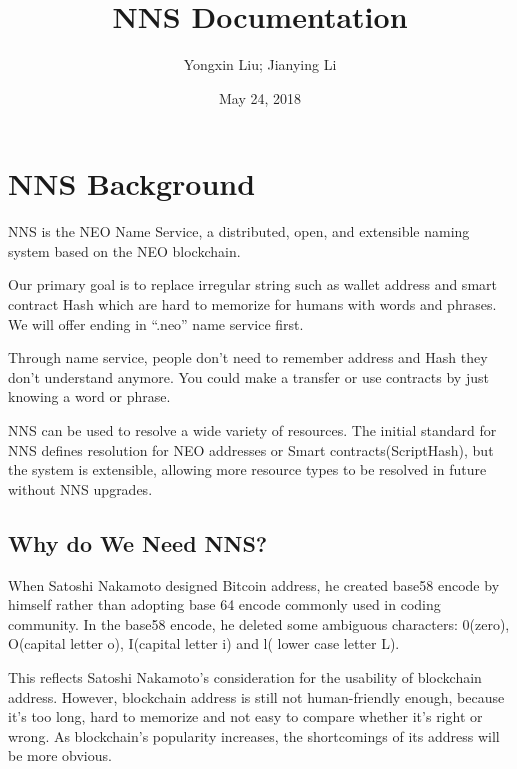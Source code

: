 \documentclass[letterpaper,10pt,english]{sphinxmanual}
\title{NNS Documentation}
\date{May 24, 2018}
\author{Yongxin Liu; Jianying Li}
\let\sphinxpxdimen\pdfpxdimen\else\newdimen\sphinxpxdimen
\begin{document}
\maketitle
\sphinxtableofcontents
{}\label{\detokenize{index::doc}}



\chapter{NNS Background}
\label{\detokenize{nns_background:welcome-to-nns-s-documentation}}\label{\detokenize{nns_background::doc}}\label{\detokenize{nns_background:nns-background}}
\noindent{\hspace*{\fill}\scalebox{0.500000}{\sphinxincludegraphics[width=370\sphinxpxdimen,height=351\sphinxpxdimen]{{logo}.png}}}

NNS is the NEO Name Service, a distributed, open, and extensible naming system based on the NEO blockchain.

Our primary goal is to replace irregular string such as wallet address and smart contract Hash which are hard to memorize for humans with words and phrases.
We will offer ending in “.neo” name service first.

Through name service, people don’t need to remember address and Hash they don’t understand anymore.
You could make a transfer or use contracts by just knowing a word or phrase.

NNS can be used to resolve a wide variety of resources.
The initial standard for NNS defines resolution for NEO addresses or Smart contracts(ScriptHash), but the system is extensible,
allowing more resource types to be resolved in future without NNS upgrades.


\section{Why do We Need NNS?}
\label{\detokenize{nns_background:why-do-we-need-nns}}
When Satoshi Nakamoto designed Bitcoin address, he created base58 encode by himself rather than adopting base 64 encode commonly used in coding community.
In the base58 encode, he deleted some ambiguous characters: 0(zero), O(capital letter o), I(capital letter i) and l( lower case letter L).

This reflects Satoshi Nakamoto’s consideration for the usability of blockchain address. However, blockchain address is still not human-friendly enough,
because it’s too long, hard to memorize and not easy to compare whether it’s right or wrong.
As blockchain’s popularity increases, the shortcomings of its address will be more obvious.
\end{document}
